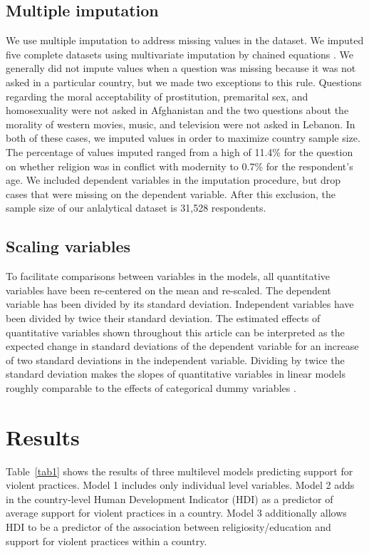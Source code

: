 \documentclass[10pt,letterpaper]{article}
\begin{document}
\subsection*{Multiple imputation}

We use multiple imputation to address missing values in the dataset. We
imputed five complete datasets using multivariate imputation by chained
equations \cite{buuren_mice_2011}. We generally did not impute values
when a question was missing because it was not asked in a particular
country, but we made two exceptions to this rule. Questions regarding
the moral acceptability of prostitution, premarital sex, and
homosexuality were not asked in Afghanistan and the two questions about
the morality of western movies, music, and television were not asked in
Lebanon. In both of these cases, we imputed values in order to maximize
country sample size. The percentage of values imputed ranged from a high
of 11.4\% for the question on whether religion was in conflict with
modernity to 0.7\% for the respondent's age. We included dependent
variables in the imputation procedure, but drop cases that were missing
on the dependent variable. After this exclusion, the sample size of our
anlalytical dataset is 31,528 respondents.

\subsection*{Scaling variables}

To facilitate comparisons between variables in the models, all
quantitative variables have been re-centered on the mean and re-scaled.
The dependent variable has been divided by its standard deviation.
Independent variables have been divided by twice their standard
deviation. The estimated effects of quantitative variables shown
throughout this article can be interpreted as the expected change in
standard deviations of the dependent variable for an increase of two
standard deviations in the independent variable. Dividing by twice the
standard deviation makes the slopes of quantitative variables in linear
models roughly comparable to the effects of categorical dummy variables
\cite{gelman_scaling_2008}.

\section*{Results}

Table~\ref{tab1} shows the results of three multilevel models predicting support for violent practices. Model 1 includes only individual level variables. Model 2 adds in the country-level Human Development Indicator (HDI) as a predictor of average support for violent practices in a country. Model 3 additionally allows HDI to be a predictor of the association between religiosity/education and support for violent practices within a country.
\end{document}
